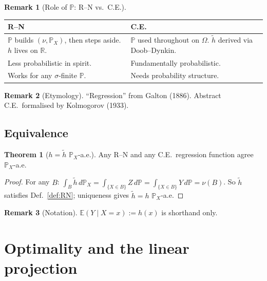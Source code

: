\documentclass[12pt, a4paper]{article}
\theoremstyle{definition}
\newtheorem{theorem}{Theorem}[section]
\newtheorem{remark}{Remark}[section]
\newcommand{\E}{\mathbb{E}}
\newcommand{\R}{\mathbb{R}}
\newcommand{\Prob}{\mathbb{P}}
\begin{document}
\begin{remark}[Role of $\Prob$: R--N vs.\ C.E.]
\begin{center}
\renewcommand{\arraystretch}{1.3}
\begin{tabular}{@{}p{5cm}p{5cm}@{}}
\toprule
\textbf{R--N} & \textbf{C.E.} \\
\midrule
$\Prob$ builds $(\nu,\Prob_X)$, then steps aside.
$h$ lives on $\R$.
& $\Prob$ used throughout on $\Omega$.
$\tilde h$ derived via Doob--Dynkin. \\
Less probabilistic in spirit. & Fundamentally probabilistic. \\
Works for any $\sigma$-finite $\Prob$. & Needs probability structure. \\
\bottomrule
\end{tabular}
\end{center}
\end{remark}

\begin{remark}[Etymology]
``Regression'' from Galton (1886).
Abstract C.E.\ formalised by Kolmogorov (1933).
\end{remark}

\subsection{Equivalence}

\begin{theorem}[$h=\tilde h$ $\Prob_X$-a.e.]\label{thm:equiv}
Any R--N and any C.E.\ regression function agree $\Prob_X$-a.e.
\end{theorem}

\begin{proof}
For any $B$: $\int_B\tilde h\,d\Prob_X
=\int_{\{X\in B\}}Z\,d\Prob
=\int_{\{X\in B\}}Y\,d\Prob=\nu(B)$.
So $\tilde h$ satisfies Def.~\ref{def:RN}; uniqueness gives
$\tilde h=h$ $\Prob_X$-a.e.
\end{proof}

\begin{remark}[Notation]
$\E(Y\mid X=x):=h(x)$ is shorthand only.
\end{remark}

\section{Optimality and the linear projection}
\end{document}
